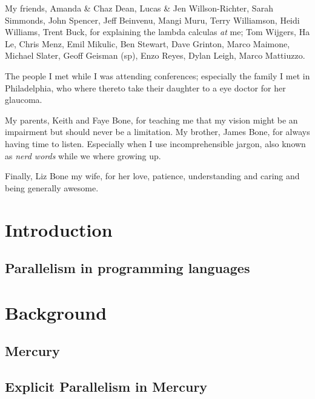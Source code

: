 \documentclass[a4paper,twoside]{report}
\begin{document}
My friends,
Amanda \& Chaz Dean,
Lucas \& Jen Willson-Richter,
Sarah Simmonds, John Spencer,
Jeff Beinvenu, Mangi Muru, 
Terry Williamson, Heidi Williams,
Trent Buck, for explaining the lambda calculas \emph{at} me;
Tom Wijgers,
Ha Le,
Chris Menz,
Emil Mikulic,
Ben Stewart,
Dave Grinton,
Marco Maimone,
Michael Slater,
Geoff Geisman (sp),
Enzo Reyes,
Dylan Leigh,
Marco Mattiuzzo.

The people I met while I was attending conferences;
especially the family I met in Philadelphia,
who where thereto take their daughter to a eye doctor for her glaucoma.

My parents, Keith and Faye Bone,
for teaching me that my vision might be an impairment but should never
be a limitation.
My brother, James Bone, for always having time to listen.
Especially when I use incomprehensible jargon,
also known as \emph{nerd words} while we where growing up.

Finally, Liz Bone my wife,
for her love, patience, understanding and caring
and being generally awesome.


\tableofcontents

\listoffigures

\listoftables

\listofalgorithms

\chapter{Introduction}
\label{chap:intro}


\section{Parallelism in programming languages}
\label{sec:literature_review}


\chapter{Background}

\section{Mercury}
\label{sec:back_mercury}


\section{Explicit Parallelism in Mercury}
\label{sec:back_mer_par}

\end{document}
